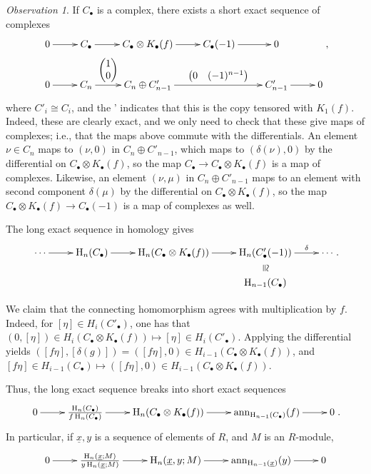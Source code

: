 \documentclass[11pt]{book}
\numberwithin{equation}{section}
\numberwithin{theorem}{chapter}
\theoremstyle{definition}
\newtheorem*{basic properties}{Basic Properties}
\newtheorem*{Important Remark}{Important Remark}
\theoremstyle{remark}
\newtheorem{observation}[theorem]{Observation}
\newcommand{\ann}{\operatorname{ann}}
\renewcommand{\H}{\operatorname{H}}
\begin{document}
\begin{observation}
	If $C_\bullet$ is a complex, there exists a short exact sequence of complexes
	$$\xymatrix{0 \ar[r]&  C_\bullet \ar[r] & C_\bullet \otimes K_\bullet(f) \ar[r] & C_\bullet(-1) \ar[r] & 0 \\ 
	0 \ar[r] &  C_n \ar[r]^-{\begin{pmatrix} 1 \\ 0 \end{pmatrix}} & C_n \oplus C'_{n-1} \ar[rr]^-{\begin{pmatrix} 0 & (-1)^{n-1} \end{pmatrix}} && C'_{n-1} \ar[r] & 0},$$
where $C'_i\cong C_i$, and the ' indicates that this is the copy tensored with $K_1(f)$. Indeed, these are clearly exact, and we only need to check that these give maps of complexes; i.e., that the maps above commute with the differentials. An element $\nu\in C_n$ maps to $(\nu,0)$ in $C_n \oplus C'_{n-1}$, which maps to $(\delta(\nu),0)$ by the differential on $C_\bullet \otimes K_\bullet(f)$, so the map $C_\bullet \to C_\bullet \otimes K_\bullet(f)$ is a map of complexes. Likewise, an element $(\nu,\mu)$ in $C_n \oplus C'_{n-1}$ maps to an element with second component $\delta(\mu)$ by the differential on $C_\bullet \otimes K_\bullet(f)$, so the map $C_\bullet \otimes K_\bullet(f) \to C_\bullet(-1)$ is a map of complexes as well.


	The long exact sequence in homology gives
	$$\xymatrix@R=5mm{\cdots \ar[r] &  \H_n(C_\bullet) \ar[r] & \H_n(C_\bullet \otimes K_\bullet(f)) \ar[r] & \H_{n}(C'_\bullet(-1)) \ar@{}[d]|*=0[@]{\cong} \ar[r]^-\delta & \cdots \\\ &&& \H_{n-1}(C_\bullet)}.$$
	
	We claim that the connecting homomorphism agrees with multiplication by $f$. Indeed, for $[\eta]\in H_i(C'_\bullet)$, one has that $(0,[\eta])\in H_i(C_\bullet \otimes K_\bullet(f))\mapsto [\eta]\in H_i(C'_\bullet)$. Applying the differential yields $([f\eta],[\delta(g)])=([f\eta],0)\in H_{i-1}(C_\bullet \otimes K_\bullet(f))$, and $[f \eta]\in H_{i-1}(C_\bullet)\mapsto ([f\eta],0)\in H_{i-1}(C_\bullet \otimes K_\bullet(f))$.
	
	Thus, the long exact sequence breaks into short exact sequences
	$$\xymatrix@R=5mm{0 \ar[r] &  \frac{\H_n(C_\bullet)}{f\H_n(C_\bullet)} \ar[r] & \H_n(C_\bullet \otimes K_\bullet(f)) \ar[r] & \ann_{\H_{n-1}(C_\bullet)}(f) \ar[r] & 0}.$$
	In particular, if $\underline{x}, y$ is a sequence of elements of $R$, and $M$ is an $R$-module,
	$$\xymatrix@R=5mm{0 \ar[r] &  \frac{\H_n(\underline{x};M)}{y\H_n(\underline{x};M)} \ar[r] & \H_n(\underline{x},y;M) \ar[r] & \ann_{\H_{n-1}(\underline{x})}(y) \ar[r] & 0}$$
\end{observation}
\end{document}
